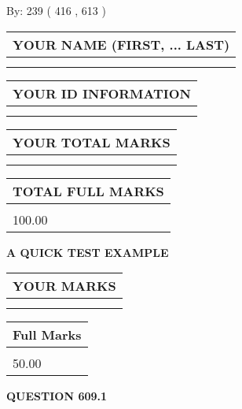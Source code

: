 \documentclass[12pt]{article}
\begin{document}
   
\hspace{1.0in} By: 
 239 ( 416 ,  613 )
   
   
   
   
\newpage 
\setcounter{page}{ 
   609001 } 
   
   
   
   
\noindent\begin{tabular}{|l|}
\hline
YOUR NAME (FIRST, ... LAST)  \\
\hline
 \\ 
 \\ 
\hline
\end{tabular}
\hspace{0.05in} \begin{tabular}{|l|}
\hline
 YOUR   ID   INFORMATION  \\
\hline
 \\ 
 \\ 
\hline
\end{tabular}
   
   
\vspace{0.2in}\noindent\begin{tabular}{|l|}
\hline
YOUR TOTAL MARKS  \\
\hline
 \\ 
 \\ 
\hline
\end{tabular}
\hspace{0.05in} \begin{tabular}{|l|}
\hline
TOTAL FULL MARKS  \\
\hline
 \\ 
100.00 \\
\hline
\end{tabular}
   
   
 \vspace{0.2in}
{\LARGE {\textbf{ A QUICK TEST EXAMPLE}}}
   
   
  
\vspace{0.2in}
  
\noindent\begin{tabular}{|l|}
\hline
 YOUR MARKS  \\
\hline
 \\ 
 \\ 
\hline
\end{tabular}
\hspace{0.05in} \begin{tabular}{|l|}
\hline
 Full Marks  \\
\hline
 \\ 
50.00 \\
\hline
\end{tabular}
{\textbf{\Large{QUESTION
609.1 
}}}
  
\end{document}
